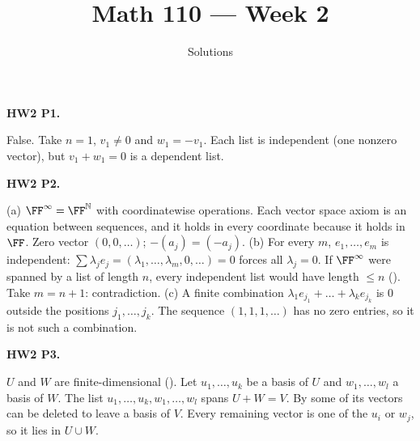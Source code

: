 \documentclass[10pt]{scrartcl}
\title{Math 110 --- Week 2}
\subtitle{Solutions}
\author{}\date{}\ihead{}
\begin{document}
\maketitle

\begin{prob}\textbf{HW2 P1.}\par{}
False. Take $n=1$, $v_1\ne0$ and $w_1=-v_1$. Each list is independent (one nonzero vector), but $v_1+w_1=0$ is a dependent list.
\end{prob}

\begin{prob}\textbf{HW2 P2.}\par{}
\begin{steps}
  \ii (a) $\FF^\infty=\FF^{\mathbb N}$ with coordinatewise operations. Each vector space axiom is an equation between sequences, and it holds in every coordinate because it holds in $\FF$. Zero vector $(0,0,\dots)$; $-(a_j)=(-a_j)$.
  \ii (b) For every $m$, $e_1,\dots,e_m$ is independent: $\sum\lambda_je_j=(\lambda_1,\dots,\lambda_m,0,\dots)=0$ forces all $\lambda_j=0$. If $\FF^\infty$ were spanned by a list of length $n$, every independent list would have length $\le n$ (). Take $m=n+1$: contradiction.
  \ii (c) A finite combination $\lambda_1e_{j_1}+\dots+\lambda_ke_{j_k}$ is $0$ outside the positions $j_1,\dots,j_k$. The sequence $(1,1,1,\dots)$ has no zero entries, so it is not such a combination.
\end{steps}
\end{prob}

\begin{prob}\textbf{HW2 P3.}\par{}
\begin{steps}
  \ii $U$ and $W$ are finite-dimensional (). Let $u_1,\dots,u_k$ be a basis of $U$ and $w_1,\dots,w_l$ a basis of $W$.
  \ii The list $u_1,\dots,u_k,w_1,\dots,w_l$ spans $U+W=V$.
  \ii By  some of its vectors can be deleted to leave a basis of $V$. Every remaining vector is one of the $u_i$ or $w_j$, so it lies in $U\cup W$.
\end{steps}
\end{prob}
\end{document}
